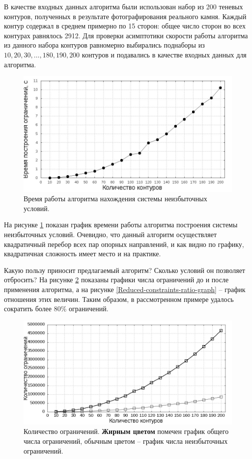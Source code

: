 \documentclass[a4paper, 10pt]{article}
\theoremstyle{definition}
\theoremstyle{plain}
\theoremstyle{plain}
\begin{document}
В качестве входных данных алгоритма были использован набор из 200 теневых
контуров, полученных в результате фотографирования реального камня. Каждый
контур содержал в среднем примерно по 15 сторон: общее число сторон во всех
контурах равнялось 2912. Для проверки асимптотики скорости работы алгоритма из
данного набора контуров равномерно выбирались поднаборы из
$10, 20 , 30, \ldots, 180, 190, 200$ контуров и подавались в качестве входных
данных для алгоритма.

\begin{figure}[hh]
 \includegraphics[width=\textwidth]{images/Problem-preparation-time-graph.jpeg}
 \caption{Время работы алгоритма нахождения системы неизбыточных условий.}
 \label{Problem-preparation-time-graph}
\end{figure}

На рисунке \ref{Problem-preparation-time-graph} показан график времени работы
алгоритма построения системы неизбыточных условий. Очевидно, что данный алгоритм
осуществляет квадратичный перебор всех пар опорных направлений, и как видно по
графику, квадратичная сложность имеет место и на практике.

Какую пользу приносит предлагаемый алгоритм? Сколько условий он позволяет
отбросить? На рисунке \ref{Reduced-constraints-count-graph} показаны графики
числа ограничений до и после применения алгоритма, а на рисунке
\ref{Reduced-constraints-ratio-graph} -- график отношения этих величин. Таким
образом, в рассмотренном примере удалось сократить более 80\% ограничений.

\begin{figure}[hh]
 \includegraphics[width=\textwidth]{images/Reduced-constraints-count-graph.jpeg}
 \caption{Количество ограничений. \textbf{Жирным цветом} помечен график общего
 числа ограничений, обычным цветом -- график числа неизбыточных ограничений.}
 \label{Reduced-constraints-count-graph}
\end{figure}
\end{document}
